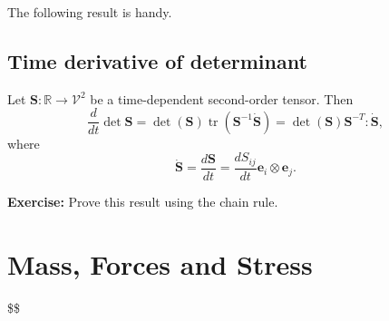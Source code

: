 \documentclass[
  letterpaper,
  DIV=11,
  numbers=noendperiod]{scrreprt}
\theoremstyle{plain}
\theoremstyle{remark}
\begin{document}
The following result is handy.

\section{Time derivative of
determinant}\label{time-derivative-of-determinant}

Let \({\boldsymbol{S}}:{\mathbb{R}}\to{\mathcal{V}}^2\) be a
time-dependent second-order tensor. Then
\[\frac{d}{dt}\det{\boldsymbol{S}}= \det({\boldsymbol{S}}){\operatorname{tr}}({\boldsymbol{S}}^{-1}\dot{{\boldsymbol{S}}}) = \det({\boldsymbol{S}}){\boldsymbol{S}}^{-T}:\dot{{\boldsymbol{S}}},\]
where
\[\dot{{\boldsymbol{S}}} = \frac{d{\boldsymbol{S}}}{dt} = \frac{dS_{ij}}{dt}{\boldsymbol{e}}_i\otimes{\boldsymbol{e}}_j.\]

\textbf{Exercise:} Prove this result using the chain rule.


\chapter{Mass, Forces and Stress}\label{sec-mass-forces}

\$\$ \newcommand{\bfa}{{\boldsymbol{a}}}
\newcommand{\bfb}{{\boldsymbol{b}}} \newcommand{\bfc}{{\boldsymbol{c}}}
\newcommand{\bfd}{{\boldsymbol{d}}} \newcommand{\bfe}{{\boldsymbol{e}}}
\newcommand{\bff}{{\boldsymbol{f}}} \newcommand{\bfg}{{\boldsymbol{g}}}
\newcommand{\bfh}{{\boldsymbol{h}}} \newcommand{\bfi}{{\boldsymbol{i}}}
\newcommand{\bfj}{{\boldsymbol{j}}} \newcommand{\bfk}{{\boldsymbol{k}}}
\newcommand{\bfl}{{\boldsymbol{l}}} \newcommand{\bfm}{{\boldsymbol{m}}}
\newcommand{\bfn}{{\boldsymbol{n}}} \newcommand{\bfo}{{\boldsymbol{o}}}
\newcommand{\bfp}{{\boldsymbol{p}}} \newcommand{\bfq}{{\boldsymbol{q}}}
\newcommand{\bfr}{{\boldsymbol{r}}} \newcommand{\bfs}{{\boldsymbol{s}}}
\newcommand{\bft}{{\boldsymbol{t}}} \newcommand{\bfu}{{\boldsymbol{u}}}
\newcommand{\bfv}{{\boldsymbol{v}}} \newcommand{\bfw}{{\boldsymbol{w}}}
\newcommand{\bfx}{{\boldsymbol{x}}} \newcommand{\bfy}{{\boldsymbol{y}}}
\newcommand{\bfz}{{\boldsymbol{z}}}

\newcommand{\bfA}{{\boldsymbol{A}}}
\newcommand{\bfB}{{\boldsymbol{B}}}
\newcommand{\bfC}{{\boldsymbol{C}}}
\newcommand{\bfD}{{\boldsymbol{D}}}
\newcommand{\bfE}{{\boldsymbol{E}}}
\newcommand{\bfF}{{\boldsymbol{F}}}
\newcommand{\bfG}{{\boldsymbol{G}}}
\newcommand{\bfH}{{\boldsymbol{H}}}
\newcommand{\bfI}{{\boldsymbol{I}}}
\newcommand{\bfJ}{{\boldsymbol{J}}}
\newcommand{\bfK}{{\boldsymbol{K}}}
\newcommand{\bfL}{{\boldsymbol{L}}}
\newcommand{\bfM}{{\boldsymbol{M}}}
\newcommand{\bfN}{{\boldsymbol{N}}}
\newcommand{\bfO}{{\boldsymbol{O}}}
\newcommand{\bfP}{{\boldsymbol{P}}}
\newcommand{\bfQ}{{\boldsymbol{Q}}}
\newcommand{\bfR}{{\boldsymbol{R}}}
\newcommand{\bfS}{{\boldsymbol{S}}}
\newcommand{\bfT}{{\boldsymbol{T}}}
\newcommand{\bfU}{{\boldsymbol{U}}}
\newcommand{\bfV}{{\boldsymbol{V}}}
\newcommand{\bfW}{{\boldsymbol{W}}}
\newcommand{\bfX}{{\boldsymbol{X}}}
\newcommand{\bfY}{{\boldsymbol{Y}}}
\newcommand{\bfZ}{{\boldsymbol{Z}}}
\end{document}
